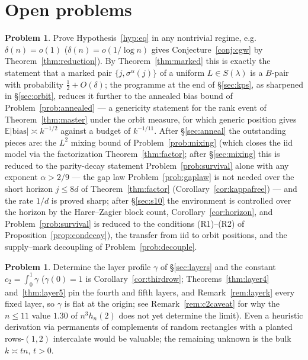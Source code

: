 \documentclass[11pt]{article}
\theoremstyle{definition}
\newtheorem{problem}[theorem]{Problem}
\newcommand{\E}{\mathbb{E}}
\begin{document}








\section{Open problems}\label{sec:open}

\begin{problem}
Prove Hypothesis~\ref{hyp:eq} in any nontrivial regime, e.g.\
$\delta(n)=o(1)$ ($\delta(n)=o(1/\log n)$ gives
Conjecture~\ref{conj:cgw} by Theorem~\ref{thm:reduction}).  By
Theorem~\ref{thm:marked} this is exactly the statement that a marked
pair $\{j,\sigma^\alpha(j)\}$ of a uniform $L\in S(\lambda)$ is a
$B$-pair with probability $\tfrac12+O(\delta)$; the programme at the
end of \S\ref{sec:kps}, as sharpened in \S\ref{sec:orbit}, reduces it
further to the annealed bias bound of Problem~\ref{prob:annealed}
--- a genericity statement for the rank event of
Theorem~\ref{thm:master} under the orbit measure, for which generic
position gives $\E|\mathrm{bias}|\asymp k^{-1/2}$ against a budget of
$k^{-1/11}$.  After \S\ref{sec:anneal} the outstanding pieces are:
the $L^2$ mixing bound of Problem~\ref{prob:mixing} (which closes the
iid model via the factorization Theorem~\ref{thm:factor}; after
\S\ref{sec:mixing} this is reduced to the parity-decay statement
Problem~\ref{prob:survival} alone with any exponent $\alpha>2/9$
--- the gap law Problem~\ref{prob:gaplaw} is not needed over the
short horizon $j\le8d$ of Theorem~\ref{thm:factor}
(Corollary~\ref{cor:kappafree}) --- and the rate $1/d$ is proved
sharp; after \S\ref{sec:s10} the environment is controlled over the
horizon by the Harer--Zagier block count, Corollary~\ref{cor:horizon},
and Problem~\ref{prob:survival} is reduced to the conditions
(R1)--(R2) of Proposition~\ref{prop:condecay}), the
transfer from iid to orbit positions, and the supply--mark decoupling
of Problem~\ref{prob:decouple}.
\end{problem}

\begin{problem}
Determine the layer profile $\gamma$ of \S\ref{sec:layers} and the constant
$c_2=\int_0^1\gamma$ ($\gamma(0)=1$ is Corollary~\ref{cor:thirdrow};
Theorems~\ref{thm:layer4} and~\ref{thm:layer5} pin the fourth and fifth
layers, and Remark~\ref{rem:layerk} every fixed layer, so $\gamma$ is
flat at the origin; see Remark~\ref{rem:c2caveat} for
why the $n\le11$ value $1.30$ of $n^3h_n(2)$ does not yet determine the
limit).  Even a heuristic derivation via permanents of complements of
random rectangles with a planted rows-$(1,2)$ intercalate would be
valuable; the remaining unknown is the bulk $k\asymp tn$, $t>0$.
\end{problem}
\end{document}

